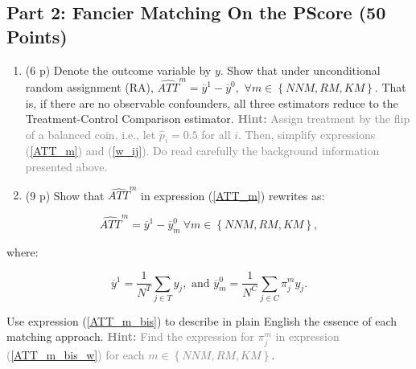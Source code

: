 \documentclass[
]{article}
\begin{document}
\subsection{Part 2: Fancier Matching On the PScore (50
Points)}\label{part-2-fancier-matching-on-the-pscore-50-points}


\newpage

\begin{enumerate}
\def\labelenumi{\arabic{enumi}.}
\setcounter{enumi}{3}
\item
  (6 p) Denote the outcome variable by \(y\). Show that under
  unconditional random assignment (RA),
  \(\widehat{ATT}^{m}=\overline{y}^{1}-\overline{y}^{0},\)
  \(\forall m\in \left\{ NNM,RM,KM\right\}\). That is, if there are no
  observable confounders, all three estimators reduce to the
  Treatment-Control Comparison estimator.
  \textcolor{gray}{\textbf{Hint:} Assign treatment by the flip of a balanced coin, i.e., let $\widehat{p}_{i}=0.5$ for all $i$. Then, simplify expressions (\ref{ATT_m}) and (\ref{w_ij}). Do read carefully the background information presented above.}
\item
  (9 p) Show that \(\widehat{ATT}^{m}\) in expression (\ref{ATT_m})
  rewrites as:
\end{enumerate}

\begin{equation} \label{ATT_m_bis}
\widehat{ATT}^{m} =\overline{y}^{1}-\overline{y}_{m}^{0} \ \forall m\in \left\{ NNM,RM,KM\right\},
\end{equation}

\noindent where:

\begin{equation}\label{ATT_m_bis_w}
\overline{y}^{1} =\frac{1}{N^{T}}\sum_{j \in T}y_{j}, \text{     and      }  \overline{y}_{m}^{0} =\frac{1}{N^{C}}\sum_{j \in C}\pi_{j}^{m}y_{j}.
\end{equation}

\noindent Use expression (\ref{ATT_m_bis}) to describe in plain English
the essence of each matching approach.
\textcolor{gray}{\textbf{Hint:} Find the expression for $\pi _{j}^{m}$ in expression (\ref{ATT_m_bis_w}) for each $m\in \left\{NNM,RM,KM\right\} $}.
\end{document}
